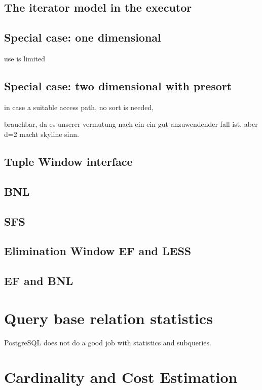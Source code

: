 \subsection{The iterator model in the executor}

\subsection{Special case: one dimensional}
use is limited


\subsection{Special case: two dimensional with presort}
in case a suitable access path, no sort is needed,

brauchbar, da es unserer vermutung nach ein ein gut anzuwendender fall ist, aber d=2 macht skyline sinn.


\subsection{Tuple Window interface}

\subsection{BNL}

\subsection{SFS}

\subsection{Elimination Window EF and LESS}

\subsection{EF and BNL}

\section{Query base relation statistics}

PostgreSQL does not do a good job with statistics and subqueries.

\section{Cardinality and Cost Estimation}

